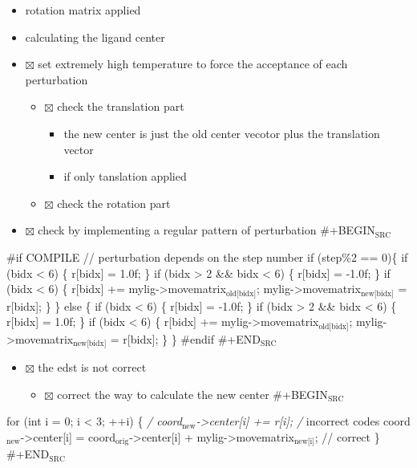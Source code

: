 \documentclass[11pt]{article}
\begin{document}
\begin{enumerate}
\begin{itemize}
\item rotation matrix applied
\item calculating the ligand center
\item $\boxtimes$ set extremely high temperature to force the acceptance of each perturbation
\begin{itemize}
\item $\boxtimes$ check the translation part
\begin{itemize}
\item the new center is just the old center vecotor plus the translation vector
\item if only tanslation applied
\end{itemize}
\item $\boxtimes$ check the rotation part
\end{itemize}
\item $\boxtimes$ check by implementing a regular pattern of perturbation
\#+BEGIN$_{\text{SRC}}$
\end{itemize}
\#if COMPILE
      // perturbation depends on the step number
      if (step\%2 == 0)\{
        if (bidx < 6) \{
          r[bidx] = 1.0f;
        \}
        if (bidx > 2 \&\& bidx < 6) \{    
          r[bidx] = -1.0f;
        \}
        if (bidx < 6) \{
          r[bidx] += mylig->movematrix$_{\text{old[bidx]}}$;
          mylig->movematrix$_{\text{new[bidx]}}$ = r[bidx];
        \}
      \}
      else
        \{
        if (bidx < 6) \{
          r[bidx] = -1.0f;
        \}
        if (bidx > 2 \&\& bidx < 6) \{    
          r[bidx] = 1.0f;
        \}
        if (bidx < 6) \{
          r[bidx] += mylig->movematrix$_{\text{old[bidx]}}$;
          mylig->movematrix$_{\text{new[bidx]}}$ = r[bidx];
        \}
      \}
\#endif
\#+END$_{\text{SRC}}$
\begin{itemize}
\item $\boxtimes$ the edst is not correct
\begin{itemize}
\item $\boxtimes$ correct the way to calculate the new center
\#+BEGIN$_{\text{SRC}}$
\end{itemize}
\end{itemize}
for (int i = 0; i < 3; ++i) \{ 
  \emph{/ coord$_{\text{new}}$->center[i] += r[i]; /} incorrect codes
  coord$_{\text{new}}$->center[i] = coord$_{\text{orig}}$->center[i] + mylig->movematrix$_{\text{new[i]}}$; // correct 
\}
\#+END$_{\text{SRC}}$
\end{enumerate}
\end{document}
